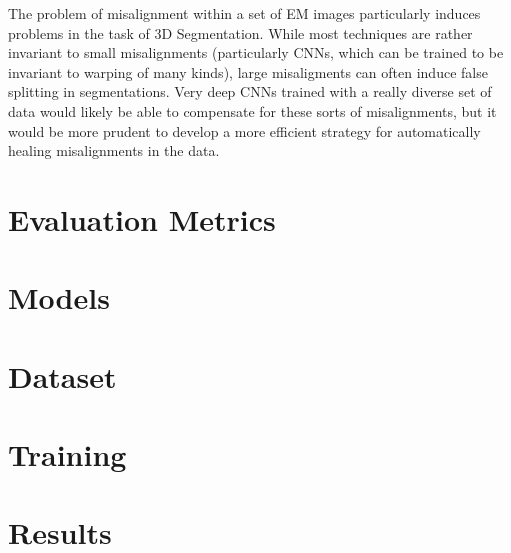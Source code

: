 The problem of misalignment within a set of EM images particularly induces problems in the task of 3D Segmentation. While most techniques are rather invariant to small misalignments (particularly CNNs, which can be trained to be invariant to warping of many kinds), large misaligments can often induce false splitting in segmentations. Very deep CNNs trained with a really diverse set of data would likely be able to compensate for these sorts of misalignments, but it would be more prudent to develop a more efficient strategy for automatically healing misalignments in the data. 

\section{Evaluation Metrics}

\section{Models}

\section{Dataset}

\section{Training}

\section{Results}